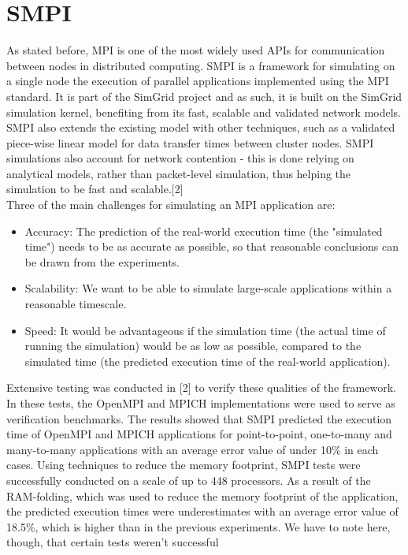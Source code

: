 \documentclass[a4paper]{article}
\begin{document}
\section{SMPI}
As stated before, MPI is one of the most widely used APIs for
communication between nodes in distributed computing. SMPI is a
framework for simulating on a single node the execution of parallel
applications implemented using the MPI standard. It is part of the
SimGrid project and as such, it is built on the SimGrid simulation
kernel, benefiting from its fast, scalable and validated network
models. SMPI also extends the existing model with other techniques,
such as a validated piece-wise linear model for data transfer times
between cluster nodes. SMPI simulations also account for network
contention - this is done relying on analytical models, rather than
packet-level simulation, thus helping the simulation to be fast and
scalable.[2]\\
Three of the main challenges for simulating an MPI application are:
\begin{itemize}
\item Accuracy: The prediction of the real-world execution time (the
  "simulated time") needs to be as accurate as possible, so that
  reasonable conclusions can be drawn from the experiments.
\item Scalability: We want to be able to simulate large-scale
  applications within a reasonable timescale.
\item Speed: It would be advantageous if the simulation time (the
  actual time of running the simulation) would be as low as possible,
  compared to the simulated time (the predicted execution time of the
  real-world application).
\end{itemize}
Extensive testing was conducted in [2] to verify these qualities of
the framework. In these tests, the OpenMPI and MPICH implementations
were used to serve as verification benchmarks. The results showed that
SMPI predicted the execution time of OpenMPI and MPICH applications
for point-to-point, one-to-many and many-to-many applications with an
average error value of under 10\% in each cases. Using techniques to
reduce the memory footprint, SMPI tests were successfully conducted on
a scale of up to 448 processors. As a result of the RAM-folding, which
was used to reduce the memory footprint of the application, the
predicted execution times were underestimates with an average error
value of 18.5\%, which is higher than in the previous experiments. We
have to note here, though, that certain tests weren't successful
\end{document}
